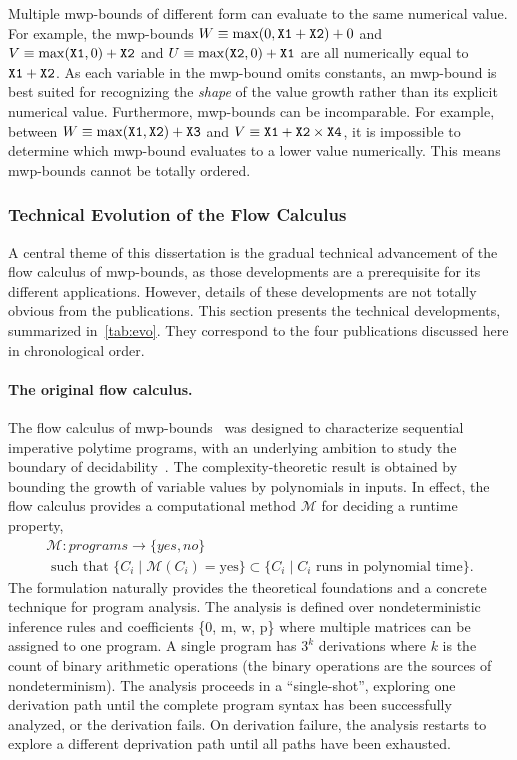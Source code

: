 \noindent Multiple mwp-bounds of different form can evaluate to the same numerical value.
For example, the mwp-bounds
\(W \equiv \max(0,\prm{X1}+\prm{X2})+0\) and
\(V \equiv \max(\prm{X1},0)+\prm{X2}\) and
\(U \equiv \max(\prm{X2},0)+\prm{X1}\) are all numerically equal to \(\prm{X1}+\prm{X2}\).
As each variable in the mwp-bound omits constants, an mwp-bound is best suited for recognizing the \emph{shape} of the value growth rather than its explicit numerical value.
Furthermore, mwp-bounds can be incomparable.
For example, between \(W \equiv \max(\prm{X1},\prm{X2})+\prm{X3}\) and \(V \equiv \prm{X1}+\prm{X2}\times\prm{X4}\), it is impossible to determine which mwp-bound evaluates to a lower value numerically.
This means mwp-bounds cannot be totally ordered.

\subsubsection{Technical Evolution of the Flow Calculus}

A central theme of this dissertation is the gradual technical advancement of the flow calculus of mwp-bounds, as those developments are a prerequisite for its different applications.
However, details of these developments are not totally obvious from the publications.
This section presents the technical developments, summarized in~\autoref{tab:evo}.
They correspond to the four publications discussed here in chronological order.

\paragraph*{The original flow calculus.}
The flow calculus of mwp-bounds~\cite{jones2009} was designed to characterize sequential imperative polytime programs, 
with an underlying ambition to study the boundary of decidability~\cite{kristiansen2017}.
The complexity-theoretic result is obtained by bounding the growth of variable values by polynomials in inputs.
In effect, the flow calculus provides a computational method \(\mathcal{M}\) for deciding a runtime property,
\begin{gather*}
\mathcal{M}: programs \rightarrow \{yes, no \} \\
\text{ such that } \{C_i \mid \mathcal{M}(C_i) = \text{yes} \} \subset \{ C_i \mid C_i \text{ runs in polynomial time}\}.
\end{gather*}
The formulation naturally provides the theoretical foundations and a concrete technique for program analysis.
The analysis is defined over nondeterministic inference rules and coefficients \{0, m, w, p\} where multiple matrices can be assigned to one program.
A single program has \(3^k\) derivations where \(k\) is the count of binary arithmetic operations (the binary operations are the sources of nondeterminism).
The analysis proceeds in a \enquote{single-shot}, exploring one derivation path until the complete program syntax has been successfully analyzed, or the derivation fails.
On derivation failure, the analysis restarts to explore a different deprivation path until all paths have been exhausted.

